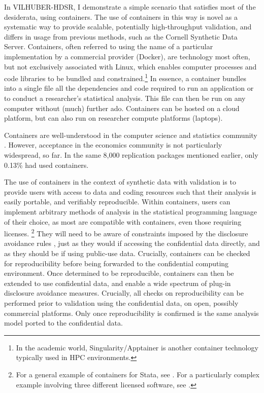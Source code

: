\documentclass[12pt]{article}
\begin{document}
In VILHUBER-HDSR, I demonstrate a simple scenario that satisfies most of the desiderata,  using containers. 
%
The use of containers in this way is novel as a systematic way to provide scalable, potentially high-throughput validation, and differs in usage from previous methods, such as the Cornell Synthetic Data Server. 
%
Containers, often referred to using the name of a particular implementation by a commercial provider (Docker), are technology most often, but not exclusively associated with Linux, which enables computer processes and code libraries to be bundled and constrained.\footnote{In the academic world, Singularity/Apptainer is another container technology typically used in \ac{HPC} environments.} In essence, a container bundles into a single file all the dependencies and code required to run an application or to conduct a researcher's statistical analysis. This file can then be run on any computer without (much) further ado. Containers can be hosted on a cloud platform, but can also run  on researcher compute platforms (laptops).  

Containers are well-understood in the computer science and statistics community \citep{boettiger_introduction_2015,moreau_containers_2023}. However, acceptance in the economics community is not particularly widespread, so far. In the same 8,000 replication packages mentioned earlier, only 0.13\% had used containers. 

The use of containers in the context of synthetic data with validation is to provide users with access to data and coding resources such that their analysis is easily portable, and verifiably reproducible. Within containers, users can implement arbitrary methods of analysis in the statistical programming language of their choice, as most are compatible with containers, even those requiring licenses.%
%
\footnote{For a general example of containers for Stata, see \citet{docker-stata}. For a particularly complex example involving three different licensed software, see \citet{lars_vilhuber_aeadataeditordocker-aer-2023-0700_2024}.}
%
They will need to be aware of constraints imposed by the disclosure avoidance rules \citep{abowd_economic_2015}, just as they would if accessing the confidential data directly, and as they should be if using public-use data. Crucially, containers can  be checked for reproducibility before being forwarded to the confidential computing environment. Once determined to be reproducible, containers can then be extended  to use confidential data, and enable a wide spectrum of plug-in disclosure avoidance measures. Crucially, all checks on reproducibility can be performed prior to validation using the confidential data, on open, possibly commercial platforms. Only once reproducibility is confirmed is the same analysis model ported to the confidential data. 
\end{document}
